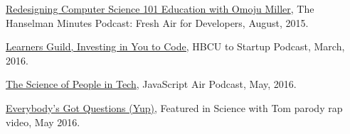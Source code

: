 \documentclass[11pt,article,oneside]{memoir}
\begin{document}
\ind \href{http://hanselminutes.com/488/redesigning-computer-science-101-education-with-omoju-miller}{Redesigning Computer Science 101 Education with Omoju Miller}, The Hanselman Minutes Podcast: Fresh Air for Developers, August, 2015.

\ind \href{https://www.youtube.com/watch?v=T0wQRr4RuqM&ab_channel=HBCUtoStartup}{Learners Guild, Investing in You to Code,} HBCU to Startup Podcast, March, 2016.

\ind \href{http://audio.javascriptair.com/e/022-jsair-the-science-of-people-in-tech-with-kate-edwards-omoju-miller-and-steve-andrews/}{The Science of People in Tech}, JavaScript Air Podcast, May, 2016.

\ind \href{https://www.youtube.com/watch?v=q5mmE05e82I&ab_channel=ScienceWithTom}{Everybody's Got Questions (Yup)}, Featured in Science with Tom parody rap video, May 2016.
\end{document}

